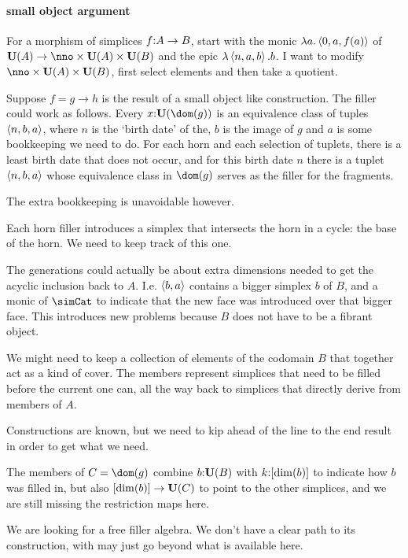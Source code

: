 \documentclass[csh.tex]{subfiles}
\begin{document}
\paragraph{small object argument}

For a morphism of simplices $f\mathord : A \to B$, start with the monic
$\lambda a .\left\langle 0,a,f(a) \right\rangle$ of $\base(A)\to \nno\times\base(A)\times \base(B)$ and the epic $\lambda \left\langle n,a,b \right\rangle .b$. I want to modify $\nno\times\base(A)\times \base(B)$, first select elements and then take a quotient.

Suppose $f = g\to h$ is the result of a small object like construction. The filler could work as follows. Every $x\of\base(\dom(g))$ is an equivalence class of tuples $\left\langle n,b,a \right\rangle$, where $n$ is the `birth date' of the, $b$ is the image of $g$ and $a$ is some bookkeeping we need to do. For each horn and each selection of tuplets, there is a least birth date that does not occur, and for this birth date $n$ there is a tuplet $\left\langle n,b,a \right\rangle$ whose equivalence class in $\dom(g)$ serves as the filler for the fragments.

The extra bookkeeping is unavoidable however.

Each horn filler introduces a simplex that intersects the horn in a cycle: the base of the horn. We need to keep track of this one.

The generations could actually be about extra dimensions needed to get the acyclic inclusion back to $A$. I.e. $\left\langle b,a \right\rangle$ contains a bigger simplex $b$ of $B$, and a monic of $\simCat$ to indicate that the new face was introduced over that bigger face. This introduces new problems because $B$ does not have to be a fibrant object.

We might need to keep a collection of elements of the codomain $B$ that together act as a kind of cover. The members represent simplices that need to be filled before the current one can, all the way back to simplices that directly derive from members of $A$.     

Constructions are known, but we need to kip ahead of the line to the end result in order to get what we need. 

The members of $C=\dom(g)$ combine $b\mathord : \mathbf{U}(B)$ with $k\mathord :[\dim(b)]$ to indicate how $b$ was filled in,
but also $[\dim(b)]\to \mathbf{U}(C)$ to point to the other simplices, and we are still missing the restriction maps here.

We are looking for a free filler algebra. We don't have a clear path to its construction, with may just go beyond what is available here.
\end{document}
